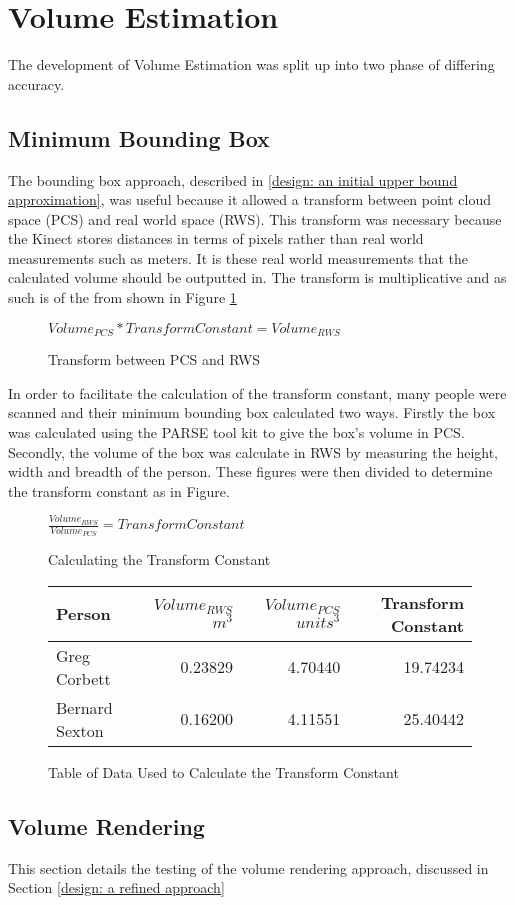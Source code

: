 \section{Volume Estimation}
\label{volume estimation}
The development of Volume Estimation was split up into two phase of differing accuracy.
\subsection{Minimum Bounding Box}
\label{testing: minimum bounding box}
The bounding box approach, described in \ref{design: an initial upper bound approximation}, was useful because it allowed a transform between point cloud space (PCS) and real world space (RWS). This transform was necessary because the Kinect stores distances in terms of pixels rather than real world measurements such as meters. It is these real world measurements that the calculated volume should be outputted in. The transform is multiplicative and as such is of the from shown in Figure \ref{testing: transform between pcs and rws}

\begin{figure}[h]
\begin{center}
$Volume_{PCS} * Transform Constant = Volume_{RWS}$
\end{center}
\caption{Transform between PCS and RWS}
\label{testing: transform between pcs and rws}
\end{figure}

In order to facilitate the calculation of the transform constant, many people were scanned and their minimum bounding box calculated two ways. Firstly the box was calculated using the PARSE tool kit to give the box's volume in PCS. Secondly, the volume of the box was calculate in RWS by measuring the height, width and breadth of the person. These figures were then divided to determine the transform constant as in Figure.

\begin{figure}[h]
\begin{center}
$\frac{Volume_{RWS}}{Volume_{PCS}} = Transform Constant$
\end{center}
\caption{Calculating the Transform Constant}
\label{testing: calculating the transform constant}
\end{figure}

\begin{figure}[h]
\begin{center}
  \begin{tabular}{| l | r | r | r |}
    \hline
    Person & $Volume_{RWS}$ $m^3$ & $Volume_{PCS}$ $units^3$ & Transform Constant \\ \hline
    Greg Corbett & 0.23829 & 4.70440 & 19.74234 \\ \hline
    Bernard Sexton & 0.16200 & 4.11551 & 25.40442 \\
    \hline
  \end{tabular}
\end{center}
\caption{Table of Data Used to Calculate the Transform Constant}
\label{testing: table of data used to calculate the transform constant}
\end{figure}

\subsection{Volume Rendering}
\label{testing: volume rendering}
This section details the testing of the volume rendering approach, discussed in Section \ref{design: a refined approach}